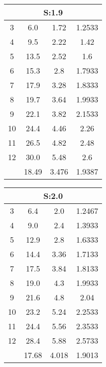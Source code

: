 \begin{table}[H]
\begin{tabular}{c|ccc}
\multicolumn{4}{c}{S:1.9}\\\hline
3 & 6.0 & 1.72 & 1.2533\\
4 & 9.5 & 2.22 & 1.42\\
5 & 13.5 & 2.52 & 1.6\\
6 & 15.3 & 2.8 & 1.7933\\
7 & 17.9 & 3.28 & 1.8333\\
8 & 19.7 & 3.64 & 1.9933\\
9 & 22.1 & 3.82 & 2.1533\\
10 & 24.4 & 4.46 & 2.26\\
11 & 26.5 & 4.82 & 2.48\\
12 & 30.0 & 5.48 & 2.6\\
\hline
& 18.49 & 3.476 & 1.9387\\
\end{tabular}
\end{table}
\begin{table}[H]
\begin{tabular}{c|ccc}
\multicolumn{4}{c}{S:2.0}\\\hline
3 & 6.4 & 2.0 & 1.2467\\
4 & 9.0 & 2.4 & 1.3933\\
5 & 12.9 & 2.8 & 1.6333\\
6 & 14.4 & 3.36 & 1.7133\\
7 & 17.5 & 3.84 & 1.8133\\
8 & 19.0 & 4.3 & 1.9933\\
9 & 21.6 & 4.8 & 2.04\\
10 & 23.2 & 5.24 & 2.2533\\
11 & 24.4 & 5.56 & 2.3533\\
12 & 28.4 & 5.88 & 2.5733\\
\hline
& 17.68 & 4.018 & 1.9013\\
\end{tabular}
\end{table}
